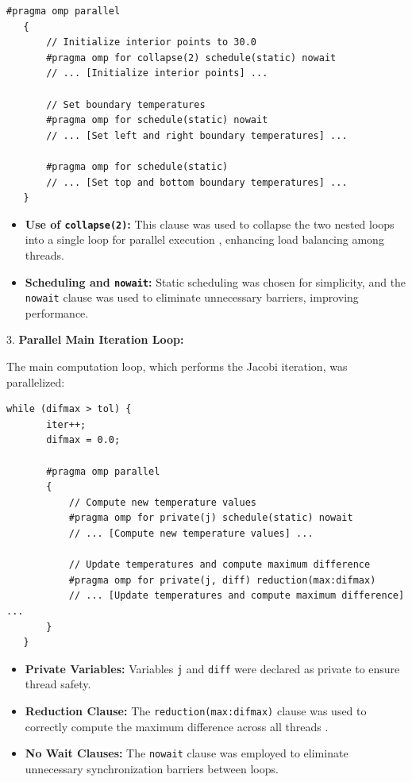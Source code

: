 \documentclass{article}
\begin{document}
   \begin{lstlisting}[style=CStyle, caption={Parallel Initialization}]
   #pragma omp parallel
   {
       // Initialize interior points to 30.0
       #pragma omp for collapse(2) schedule(static) nowait
       // ... [Initialize interior points] ...

       // Set boundary temperatures
       #pragma omp for schedule(static) nowait
       // ... [Set left and right boundary temperatures] ...

       #pragma omp for schedule(static)
       // ... [Set top and bottom boundary temperatures] ...
   }
   \end{lstlisting}

    \begin{itemize}
        \item \textbf{Use of \texttt{collapse(2)}:} This clause was used to collapse the two nested loops into a single loop for parallel execution \parencite{openmp}, enhancing load balancing among threads.
        \item \textbf{Scheduling and \texttt{nowait}:} Static scheduling was chosen for simplicity, and the \texttt{nowait} clause was used to eliminate unnecessary barriers, improving performance.
    \end{itemize}

3. \textbf{Parallel Main Iteration Loop:}

   The main computation loop, which performs the Jacobi iteration, was parallelized:

   \begin{lstlisting}[style=CStyle, caption={Parallel Main Iteration Loop}]
   while (difmax > tol) {
       iter++;
       difmax = 0.0;

       #pragma omp parallel
       {
           // Compute new temperature values
           #pragma omp for private(j) schedule(static) nowait
           // ... [Compute new temperature values] ...

           // Update temperatures and compute maximum difference
           #pragma omp for private(j, diff) reduction(max:difmax)
           // ... [Update temperatures and compute maximum difference] ...
       }
   }
   \end{lstlisting}

    \begin{itemize}
        \item \textbf{Private Variables:} Variables \texttt{j} and \texttt{diff} were declared as private to ensure thread safety.
        \item \textbf{Reduction Clause:} The \texttt{reduction(max:difmax)} clause was used to correctly compute the maximum difference across all threads \parencite{chapman2007openmp}.
        \item \textbf{No Wait Clauses:} The \texttt{nowait} clause was employed to eliminate unnecessary synchronization barriers between loops.
    \end{itemize}
\end{document}
